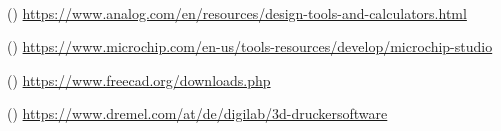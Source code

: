 \begin{table}[!ht]
\begin{threeparttable}
\begin{tablenotes}
      \item[~]
\setcounter{softwaretnotecounter}{0}
\ifsoftwarepagelineartechnology
      \item[(\thesoftwaretnotecounter)] \url{https://www.analog.com/en/resources/design-tools-and-calculators.html}
\fi
\ifsoftwarepagemicrochipstudio
      \item[(\thesoftwaretnotecounter)] \url{https://www.microchip.com/en-us/tools-resources/develop/microchip-studio}
\fi
\ifsoftwarepagefreecad
      \item[(\thesoftwaretnotecounter)] \url{https://www.freecad.org/downloads.php}
\fi
\ifsoftwarepagedremeldigilabslicer
      \item[(\thesoftwaretnotecounter)] \url{https://www.dremel.com/at/de/digilab/3d-druckersoftware}  
\fi
    \end{tablenotes}
  \end{threeparttable}
\end{table}
